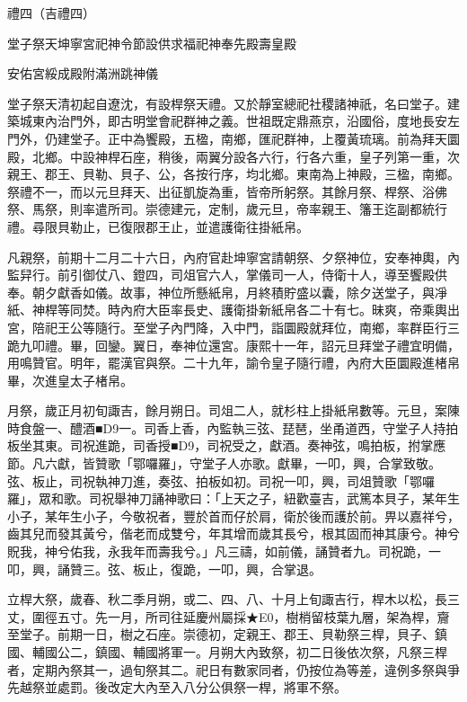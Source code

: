 
\begin{pinyinscope}
禮四（吉禮四）

堂子祭天坤寧宮祀神令節設供求福祀神奉先殿壽皇殿

安佑宮綏成殿附滿洲跳神儀

堂子祭天清初起自遼沈，有設桿祭天禮。又於靜室總祀社稷諸神祇，名曰堂子。建築城東內治門外，即古明堂會祀群神之義。世祖既定鼎燕京，沿國俗，度地長安左門外，仍建堂子。正中為饗殿，五楹，南鄉，匯祀群神，上覆黃琉璃。前為拜天圜殿，北鄉。中設神桿石座，稍後，兩翼分設各六行，行各六重，皇子列第一重，次親王、郡王、貝勒、貝子、公，各按行序，均北鄉。東南為上神殿，三楹，南鄉。祭禮不一，而以元旦拜天、出征凱旋為重，皆帝所躬祭。其餘月祭、桿祭、浴佛祭、馬祭，則率遣所司。崇德建元，定制，歲元旦，帝率親王、籓王迄副都統行禮。尋限貝勒止，已復限郡王止，並遣護衛往掛紙帛。

凡親祭，前期十二月二十六日，內府官赴坤寧宮請朝祭、夕祭神位，安奉神輿，內監舁行。前引御仗八、鐙四，司俎官六人，掌儀司一人，侍衛十人，導至饗殿供奉。朝夕獻香如儀。故事，神位所懸紙帛，月終積貯盛以囊，除夕送堂子，與凈紙、神桿等同焚。時內府大臣率長史、護衛掛新紙帛各二十有七。昧爽，帝乘輿出宮，陪祀王公等隨行。至堂子內門降，入中門，詣圜殿就拜位，南鄉，率群臣行三跪九叩禮。畢，回鑾。翼日，奉神位還宮。康熙十一年，詔元旦拜堂子禮宜明備，用鳴贊官。明年，罷漢官與祭。二十九年，諭令皇子隨行禮，內府大臣圜殿進楮帛畢，次進皇太子楮帛。

月祭，歲正月初旬諏吉，餘月朔日。司俎二人，就杉柱上掛紙帛數等。元旦，案陳時食盤一、醴酒■D9一。司香上香，內監執三弦、琵琶，坐甬道西，守堂子人持拍板坐其東。司祝進跪，司香授■D9，司祝受之，獻酒。奏神弦，鳴拍板，拊掌應節。凡六獻，皆贊歌「鄂囉羅」，守堂子人亦歌。獻畢，一叩，興，合掌致敬。弦、板止，司祝執神刀進，奏弦、拍板如初。司祝一叩，興，司俎贊歌「鄂囉羅」，眾和歌。司祝舉神刀誦神歌曰：「上天之子，紐歡臺吉，武篤本貝子，某年生小子，某年生小子，今敬祝者，豐於首而仔於肩，衛於後而護於前。畀以嘉祥兮，齒其兒而發其黃兮，偕老而成雙兮，年其增而歲其長兮，根其固而神其康兮。神兮貺我，神兮佑我，永我年而壽我兮。」凡三禱，如前儀，誦贊者九。司祝跪，一叩，興，誦贊三。弦、板止，復跪，一叩，興，合掌退。

立桿大祭，歲春、秋二季月朔，或二、四、八、十月上旬諏吉行，桿木以松，長三丈，圍徑五寸。先一月，所司往延慶州屬採★E0，樹梢留枝葉九層，架為桿，齎至堂子。前期一日，樹之石座。崇德初，定親王、郡王、貝勒祭三桿，貝子、鎮國、輔國公二，鎮國、輔國將軍一。月朔大內致祭，初二日後依次祭，凡祭三桿者，定期內祭其一，過旬祭其二。祀日有數家同者，仍按位為等差，違例多祭與爭先越祭並處罰。後改定大內至入八分公俱祭一桿，將軍不祭。


\end{pinyinscope}
